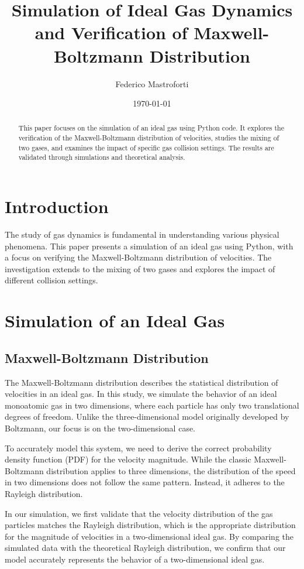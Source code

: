 \documentclass{article}
\title{Simulation of Ideal Gas Dynamics and Verification of Maxwell-Boltzmann Distribution}
\author{Federico Mastroforti}
\date{\today}
\begin{document}
\maketitle
\begin{abstract}
    This paper focuses on the simulation of an ideal gas using Python code. It explores the verification of the Maxwell-Boltzmann distribution of velocities, studies the mixing of two gases, and examines the impact of specific gas collision settings. The results are validated through simulations and theoretical analysis.
\end{abstract}

\tableofcontents

\section{Introduction}
The study of gas dynamics is fundamental in understanding various physical phenomena. This paper presents a simulation of an ideal gas using Python, with a focus on verifying the Maxwell-Boltzmann distribution of velocities. The investigation extends to the mixing of two gases and explores the impact of different collision settings.

\section{Simulation of an Ideal Gas}
\subsection{Maxwell-Boltzmann Distribution}
The Maxwell-Boltzmann distribution describes the statistical distribution of velocities in an ideal gas. In this study, we simulate the behavior of an ideal monoatomic gas in two dimensions, where each particle has only two translational degrees of freedom. Unlike the three-dimensional model originally developed by Boltzmann, our focus is on the two-dimensional case.

To accurately model this system, we need to derive the correct probability density function (PDF) for the velocity magnitude. While the classic Maxwell-Boltzmann distribution applies to three dimensions, the distribution of the speed in two dimensions does not follow the same pattern. Instead, it adheres to the Rayleigh distribution.

In our simulation, we first validate that the velocity distribution of the gas particles matches the Rayleigh distribution, which is the appropriate distribution for the magnitude of velocities in a two-dimensional ideal gas. By comparing the simulated data with the theoretical Rayleigh distribution, we confirm that our model accurately represents the behavior of a two-dimensional ideal gas.
\end{document}
